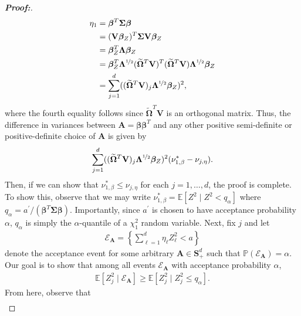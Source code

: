\documentclass[11pt,twoside]{article}
\theoremstyle{definition}
\theoremstyle{remark}
\begin{document}
\begin{proof}[\textbf{Proof:}]
    \begin{align*}
        \eta_1 &= \bm{\beta}^T \mathbf{\Sigma} \bm{\beta} \\
        &= (\mathbf{V} \bm{\beta}_Z)^T \mathbf{\Sigma} \mathbf{V} \bm{\beta}_Z \\
        &= \bm{\beta}^T_Z \mathbf{\Lambda} \bm{\beta}_Z \\
        &= \bm{\beta}^T_Z \mathbf{\Lambda}^{\nicefrac{1}{2}}(\widetilde{\mathbf{\Omega}}^T \mathbf{V})^T (\widetilde{\mathbf{\Omega}}^T \mathbf{V}) \mathbf{\Lambda}^{\nicefrac{1}{2}}\bm{\beta}_Z \\
        &= \sum^d_{j=1} ((\widetilde{\mathbf{\Omega}}^T \mathbf{V})_j \mathbf{\Lambda}^{\nicefrac{1}{2}} \bm{\beta}_Z)^2,
    \end{align*}
    where the fourth equality follows since $\widetilde{\mathbf{\Omega}}^T \mathbf{V}$ is an orthogonal matrix. Thus, the difference in variances between $\mathbf{A} = \bm{\beta} \bm{\beta}^T$ and any other positive semi-definite or positive-definite choice of $\mathbf{A}$ is given by
    \begin{align*}
        \sum^d_{j=1} ((\widetilde{\mathbf{\Omega}}^T \mathbf{V})_j \mathbf{\Lambda}^{\nicefrac{1}{2}} \bm{\beta}_Z)^2(\nu^*_{1, \beta} - \nu_{j, \eta}).
    \end{align*}
    Then, if we can show that $\nu^*_{1, \beta} \leq \nu_{j, \eta}$ for each $j = 1, \ldots, d$, the proof is complete. To show this, observe that we may write $\nu^*_{1, \beta} = \mathbb{E}[Z^2 \mid Z^2 < q_\alpha]$ where $q_\alpha = a^\prime / (\bm{\beta}^T \mathbf{\Sigma} \bm{\beta})$. Importantly, since $a^\prime$ is chosen to have acceptance probability $\alpha$, $q_\alpha$ is simply the $\alpha$-quantile of a $\chi^2_1$ random variable. Next, fix $j$ and let
    \begin{align*}
        \mathcal{E}_{\mathbf{A}} = \left\{ \sum^d_{\ell=1} \eta_\ell Z^2_\ell < a\right\}
    \end{align*}
    denote the acceptance event for some arbitrary $\mathbf{A} \in \mathbf{S}^d_{+}$ such that $\mathbb{P}(\mathcal{E}_{\mathbf{A}}) = \alpha$. Our goal is to show that among all events $\mathcal{E}_{\mathbf{A}}$ with acceptance probability $\alpha$,
    \begin{align*}
        \mathbb{E}[Z^2_j \mid \mathcal{E}_{\mathbf{A}}] \geq \mathbb{E}[Z^2_j \mid Z^2_j \leq q_\alpha].
    \end{align*}
    From here, observe that
    \begin{align} \label{expectation_inequality}

\end{align}
\end{proof}
\end{document}
